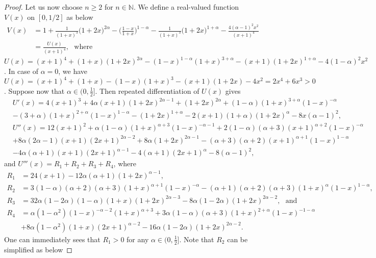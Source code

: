\documentclass[12pt]{amsart}
\theoremstyle{definition}
\theoremstyle{plain}
\theoremstyle{definition}
\numberwithin{equation}{section}
\begin{document}
\begin{proof}
Let us now choose $n\geq2$ for $n\in\mathbb{N}$. We define a real-valued function $V(x)$ on $[0, 1/2]$ as below
\begin{align*}
V(x)&=1+\frac{1}{(1+x)^{3}}\Big(1+2x\Big)^{2\alpha}-\Big(\frac{1-x}{1+x}\Big)^{1-\alpha}-\frac{1}{(1+x)^{3}}\Big(1+2x\Big)^{1+\alpha}-\frac{4(\alpha-1)^{2}x^{2}}{(x+1)^{4}}\\
&=\frac{U(x)}{(x+1)^{4}}, ~~~\mbox{where}
\end{align*}
$U(x)=(x+1)^{4}+(1+x)(1+2x)^{2\alpha}-(1-x)^{1-\alpha}(1+x)^{3+\alpha}-(x+1)(1+2x)^{1+\alpha}-4(1-\alpha)^{2}x^{2}$. In case of $\alpha=0$, we have $U(x)=(x+1)^{4}+(1+x)-(1-x)(1+x)^{3}-(x+1)(1+2x)-4x^{2}=2x^{4}+6x^{3}>0$. Suppose now that $\alpha\in(0, \frac{1}{2}]$. Then repeated differentiation of $U(x)$ gives
\begin{align*}
&U'(x)=4(x+1)^{3}+4\alpha(x+1)(1+2x)^{2\alpha-1}+(1+2x)^{2\alpha}+(1-\alpha)(1+x)^{3+\alpha}(1-x)^{-\alpha}\\
&-(3+\alpha)(1+x)^{2+\alpha}(1-x)^{1-\alpha}-(1+2x)^{1+\alpha}-2(x+1)(1+\alpha)(1+2x)^{\alpha}-8x(\alpha-1)^{2},
\end{align*}
\begin{align*}
&U''(x)=12(x+1)^{2}+\alpha(1-\alpha)(1+x)^{\alpha+3}(1-x)^{-\alpha-1}+2(1-\alpha)(\alpha+3)(x+1)^{\alpha+2}(1-x)^{-\alpha}\\
&+8\alpha(2\alpha-1)(x+1)(2x+1)^{2\alpha-2}+8\alpha(1+2x)^{2\alpha-1}-(\alpha+3)(\alpha+2)(x+1)^{\alpha+1}(1-x)^{1-\alpha}\\
&-4\alpha(\alpha+1)(x+1)(2x+1)^{\alpha-1}-4(\alpha+1)(2x+1)^{\alpha}-8(\alpha-1)^{2},
\end{align*}
and $U'''(x)=R_{1}+R_{2}+R_{3}+R_{4}$, where
\begin{align*}
R_{1}&=24(x+1)-12\alpha(\alpha+1)(1+2x)^{\alpha-1},\\
R_{2}&=3(1-\alpha)(\alpha+2)(\alpha+3)(1+x)^{\alpha+1}(1-x)^{-\alpha}-(\alpha+1)(\alpha+2)(\alpha+3)(1+x)^{\alpha}(1-x)^{1-\alpha},\\
R_{3}&=32\alpha(1-2\alpha)(1-\alpha)(1+x)(1+2x)^{2\alpha-3}-8\alpha(1-2\alpha)(1+2x)^{2\alpha-2}, ~~~\mbox{and}\\
R_{4}&=\alpha(1-\alpha^{2})(1-x)^{-\alpha-2}(1+x)^{\alpha+3}+3\alpha(1-\alpha)(\alpha+3)(1+x)^{2+\alpha}(1-x)^{-1-\alpha}\\
&+8\alpha(1-\alpha^{2})(1+x)(2x+1)^{\alpha-2}-16\alpha(1-2\alpha)(1+2x)^{2\alpha-2}.
\end{align*}
One can immediately sees that $R_{1}>0$ for any $\alpha\in (0, \frac{1}{2}]$. Note that $R_2$ can be simplified as below

\end{proof}
\end{document}
